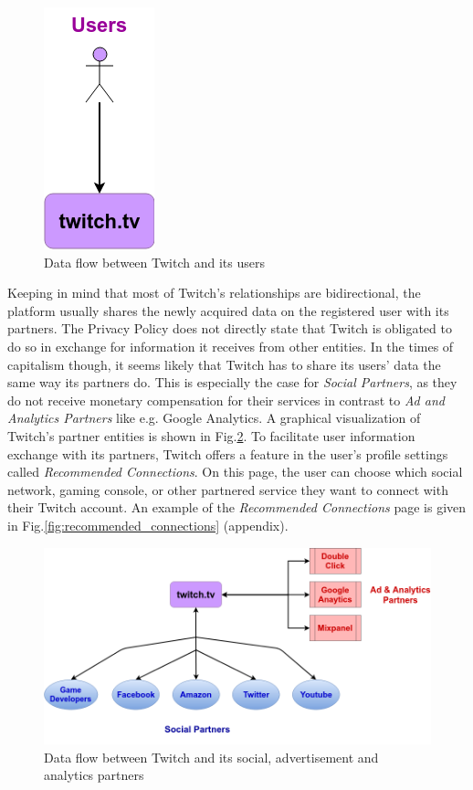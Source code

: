 \begin{figure}[h!]
	\centering
	\includegraphics[height=0.3\linewidth]{sections/figures/twitch_users}
	\caption{Data flow between Twitch and its users}
	\label{fig:twitch_users}
\end{figure}

Keeping in mind that most of Twitch's relationships are bidirectional, the platform usually shares the newly acquired data on the registered user with its partners. The Privacy Policy does not directly state that Twitch is obligated to do so in exchange for information it receives from other entities. In the times of capitalism though, it seems likely that Twitch has to share its users' data the same way its partners do. This is especially the case for \textit{Social Partners}, as they do not receive monetary compensation for their services in contrast to \textit{Ad and Analytics Partners} like e.g. Google Analytics. A graphical visualization of Twitch's partner entities is shown in Fig.\ref{fig:twitch_partners}. To facilitate user information exchange with its partners, Twitch offers a feature in the user's profile settings called \textit{Recommended Connections}. On this page, the user can choose which social network, gaming console, or other partnered service they want to connect with their Twitch account. An example of the \textit{Recommended Connections} page is given in Fig.\ref{fig:recommended_connections} (appendix). 

\begin{figure}[h!]
	\centering
	\includegraphics[width=0.9\linewidth]{sections/figures/twitch_partners}
	\caption{Data flow between Twitch and its social, advertisement and analytics partners}
	\label{fig:twitch_partners}
\end{figure}

